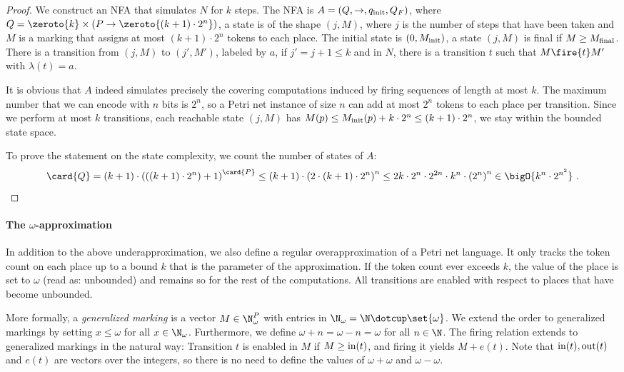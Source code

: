 \documentclass[../../diss.tex]{subfiles}
\begin{document}
\begin{proof}
    We construct an NFA that simulates $N$ for $k$ steps.
    The NFA is $A = (Q,\to,q_{\text{init}},Q_F)$, where $Q = \zeroto{k} \times (P \to \zeroto{(k+1) \cdot 2^n})$, \ie a state is of the shape $(j,M)$, where $j$ is the number of steps that have been taken and $M$ is a marking that assigns at most $(k+1) \cdot 2^n$ tokens to each place.
    The initial state is $(0,M_{\text{init}})$, a state $(j,M)$ is final if $M \geq M_{\text{final}}$.
    There is a transition from $(j,M)$ to $(j',M')$, labeled by $a$, if $j' = j+1 \leq k$ and in $N$, there is a transition $t$ such that $M \fire{t} M'$ with $\lambda(t) = a$.

    It is obvious that $A$ indeed simulates precisely the covering computations induced by firing sequences of length at most $k$.
    The maximum number that we can encode with $n$ bits is $2^n$, so a Petri net instance of size $n$ can add at most $2^n$ tokens to each place per transition.
    Since we perform at most $k$ transitions, each reachable state $(j,M)$ has $M(p) \leq M_{\text{init}}(p) + k \cdot 2^n \leq (k+1) \cdot 2^n$, \ie we stay within the bounded state space.

    To prove the statement on the state complexity, we count the number of states of $A$:
    \[
        \card{Q}
        = (k+1) \cdot {(((k+1) \cdot 2^n) + 1)}^{\card{P}}
        \leq
        (k+1) \cdot {( 2 \cdot (k+1) \cdot 2^n)}^n
        \leq 2k \cdot 2^n \cdot 2^{2n} \cdot k^n \cdot {(2^n)}^n
        \in \bigO{k^n \cdot 2^{n^2}}
        \ .
    \]
\end{proof}

\paragraph{The $\omega$-approximation}

In addition to the above underapproximation, we also define a regular overapproximation of a Petri net language.
It only tracks the token count on each place up to a bound $k$ that is the parameter of the approximation.
If the token count ever exceeds $k$, the value of the place is set to $\omega$ (read as: unbounded) and remains so for the rest of the computations.
All transitions are enabled with respect to places that have become unbounded.

More formally, a \emph{generalized marking} is a vector $M \in \N_\omega^P$ with entries in $\N_\omega = \N \dotcup \set{\omega}$.
We extend the order to generalized markings by setting $x \leq \omega$ for all $x \in \N_\omega$.
Furthermore, we define $\omega + n = \omega - n = \omega$ for all $n \in \N$.
The firing relation extends to generalized markings in the natural way: Transition $t$ is enabled in $M$ if $M \geq \text{in}(t)$, and firing it yields $M + e(t)$.
Note that $\text{in}(t), \text{out}(t)$ and $e(t)$ are vectors over the integers, so there is no need to define the values of $\omega + \omega$ and $\omega - \omega$.
\end{document}
